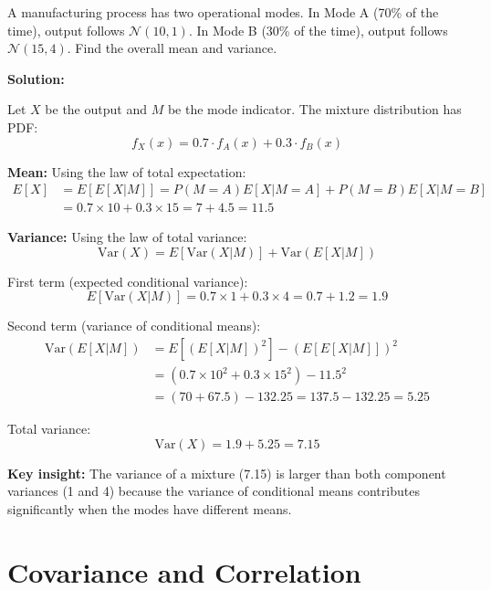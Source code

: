 \begin{examplebox}[title=Example: Mean and Variance of a Mixture of Distributions]
A manufacturing process has two operational modes. In Mode A (70\% of the time), output follows $\mathcal{N}(10, 1)$. In Mode B (30\% of the time), output follows $\mathcal{N}(15, 4)$. Find the overall mean and variance.

\textbf{Solution:}

Let $X$ be the output and $M$ be the mode indicator. The mixture distribution has PDF:
\begin{equation*}
f_X(x) = 0.7 \cdot f_A(x) + 0.3 \cdot f_B(x)
\end{equation*}

\textbf{Mean:} Using the law of total expectation:
\begin{align*}
E[X] &= E[E[X|M]] = P(M=A)E[X|M=A] + P(M=B)E[X|M=B] \\
&= 0.7 \times 10 + 0.3 \times 15 = 7 + 4.5 = 11.5
\end{align*}

\textbf{Variance:} Using the law of total variance:
\begin{equation*}
\text{Var}(X) = E[\text{Var}(X|M)] + \text{Var}(E[X|M])
\end{equation*}

First term (expected conditional variance):
\begin{equation*}
E[\text{Var}(X|M)] = 0.7 \times 1 + 0.3 \times 4 = 0.7 + 1.2 = 1.9
\end{equation*}

Second term (variance of conditional means):
\begin{align*}
\text{Var}(E[X|M]) &= E[(E[X|M])^2] - (E[E[X|M]])^2 \\
&= (0.7 \times 10^2 + 0.3 \times 15^2) - 11.5^2 \\
&= (70 + 67.5) - 132.25 = 137.5 - 132.25 = 5.25
\end{align*}

Total variance:
\begin{equation*}
\text{Var}(X) = 1.9 + 5.25 = 7.15
\end{equation*}

\textbf{Key insight:} The variance of a mixture (7.15) is larger than both component variances (1 and 4) because the variance of conditional means contributes significantly when the modes have different means.
\end{examplebox}

\section{Covariance and Correlation}

